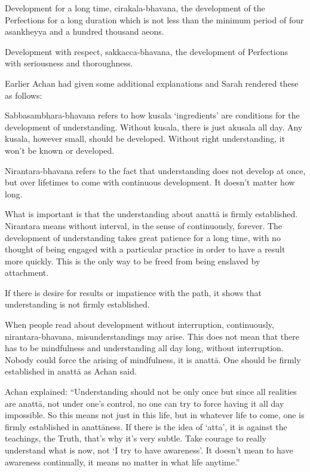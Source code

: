Development for a long time, cirakala-bhavana, the development of the Perfections for a long duration which is not less than the minimum period of four 
asankheyya and a hundred thousand aeons. 

Development with respect, sakkacca-bhavana, the development of Perfections with seriousness and thoroughness. 

Earlier  Achan had given some additional explanations and Sarah rendered these as 
follows: 

Sabbasambhara-bhavana refers to how kusala `ingredients' are conditions for the development of understanding. Without kusala, there is just akusala all day. Any kusala, 
however small, should be developed. Without right understanding, it won't be known 
or developed. 

Nirantara-bhavana refers to the fact that understanding does not develop at once, but 
over lifetimes to come with continuous development. It doesn't matter how long. 

What is important is that the understanding about anattā is firmly established. Nirantara means without interval, in the sense of continuously, forever. The development 
of understanding takes great patience for a long time, with no thought of being engaged with a particular practice in order to have a result more quickly. This is the 
only way to be freed from being enslaved by attachment. 

If there is desire for results or impatience with the path, it shows that understanding is 
not firmly established. 

When people read about development without interruption, continuously, nirantara-bhavana, misunderstandings may arise. This does not mean that there has to be mindfulness and understanding all day long, without interruption. Nobody could force the 
arising of mindfulness, it is anattā. One should be firmly established in anattā as Achan said. 

Achan explained: ``Understanding should not be only once but since all realities are 
anattā, not under one's control, no one can try to force having it all day impossible. 
So this means not just in this life, but in whatever life to come, one is firmly established in anattāness. If there is the idea of ‘atta’, it is against the teachings, the Truth, 
that’s why it’s very subtle. Take courage to really understand what is now, not ‘I try to 
have awareness’. It doesn't mean to have awareness continually, it means no matter in 
what life anytime.'' 





